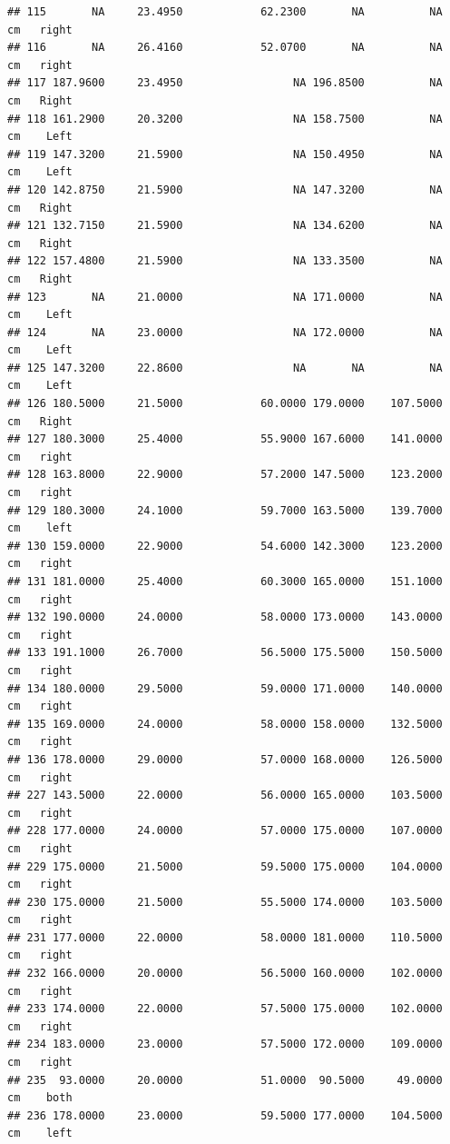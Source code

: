 \documentclass[]{article}
\begin{document}
\begin{verbatim}
## 115       NA     23.4950            62.2300       NA          NA     cm   right
## 116       NA     26.4160            52.0700       NA          NA     cm   right
## 117 187.9600     23.4950                 NA 196.8500          NA     cm   Right
## 118 161.2900     20.3200                 NA 158.7500          NA     cm    Left
## 119 147.3200     21.5900                 NA 150.4950          NA     cm    Left
## 120 142.8750     21.5900                 NA 147.3200          NA     cm   Right
## 121 132.7150     21.5900                 NA 134.6200          NA     cm   Right
## 122 157.4800     21.5900                 NA 133.3500          NA     cm   Right
## 123       NA     21.0000                 NA 171.0000          NA     cm    Left
## 124       NA     23.0000                 NA 172.0000          NA     cm    Left
## 125 147.3200     22.8600                 NA       NA          NA     cm    Left
## 126 180.5000     21.5000            60.0000 179.0000    107.5000     cm   Right
## 127 180.3000     25.4000            55.9000 167.6000    141.0000     cm   right
## 128 163.8000     22.9000            57.2000 147.5000    123.2000     cm   right
## 129 180.3000     24.1000            59.7000 163.5000    139.7000     cm    left
## 130 159.0000     22.9000            54.6000 142.3000    123.2000     cm   right
## 131 181.0000     25.4000            60.3000 165.0000    151.1000     cm   right
## 132 190.0000     24.0000            58.0000 173.0000    143.0000     cm   right
## 133 191.1000     26.7000            56.5000 175.5000    150.5000     cm   right
## 134 180.0000     29.5000            59.0000 171.0000    140.0000     cm   right
## 135 169.0000     24.0000            58.0000 158.0000    132.5000     cm   right
## 136 178.0000     29.0000            57.0000 168.0000    126.5000     cm   right
## 227 143.5000     22.0000            56.0000 165.0000    103.5000     cm   right
## 228 177.0000     24.0000            57.0000 175.0000    107.0000     cm   right
## 229 175.0000     21.5000            59.5000 175.0000    104.0000     cm   right
## 230 175.0000     21.5000            55.5000 174.0000    103.5000     cm   right
## 231 177.0000     22.0000            58.0000 181.0000    110.5000     cm   right
## 232 166.0000     20.0000            56.5000 160.0000    102.0000     cm   right
## 233 174.0000     22.0000            57.5000 175.0000    102.0000     cm   right
## 234 183.0000     23.0000            57.5000 172.0000    109.0000     cm   right
## 235  93.0000     20.0000            51.0000  90.5000     49.0000     cm    both
## 236 178.0000     23.0000            59.5000 177.0000    104.5000     cm    left

\end{verbatim}
\end{document}
